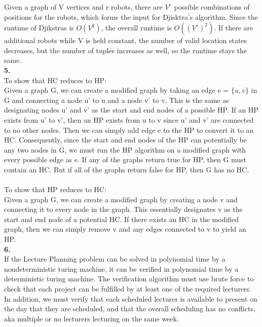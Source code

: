 \documentclass[a4paper,12pt]{article}
\begin{document}
Given a graph of V vertices and r robots, there are $V^r$ possible combinations of positions for the robots, which forms the input for Djisktra's algorithm. Since the runtime of Djikstras is $O(V^2)$, the overall runtime is $O((V^r)^2)$. If there are additional robots while V is held constant, the number of valid location states decreases, but the number of tuples increases as well, so the runtime stays the same. \\
\noindent \textbf{5.}\\
To show that HC reduces to HP: \\
Given a graph G, we can create a modified graph by taking an edge e = $\{u,v\}$ in G and connecting a node u' to u and a node v' to v. This is the same as designating nodes u' and v' as the start and end nodes of a possible HP. If an HP exists from u' to v', then an HP exists from u to v since u' and v' are connected to no other nodes. Then we can simply add edge e to the HP to convert it to an HC. Consequently, since the start and end nodes of the HP can potentially be any two nodes in G, we must run the HP algorithm on a modified graph with every possible edge as e. If any of the graphs return true for HP, then G must contain an HC. But if all of the graphs return false for HP, then G has no HC. \\\\
To show that HP reduces to HC:\\
Given a graph G, we can create a modified graph by creating a node v and connecting it to every node in the graph. This essentially designates v as the start and end node of a potential HC. If there exists an HC in the modified graph, then we can simply remove v and any edges connected to v to yield an HP. \\

\noindent \textbf{6.}\\
If the Lecture Planning problem can be solved in polynomial time by a nondeterministic turing machine, it can be verified in polynomial time by a deterministic turing machine. The verification algorithm must use brute force to check that each project can be fulfilled by at least one of the required lecturers. In addition, we must verify that each scheduled lecturer is available to present on the day that they are scheduled, and that the overall scheduling has no conflicts, aka multiple or no lecturers lecturing on the same week. \\
\end{document}
